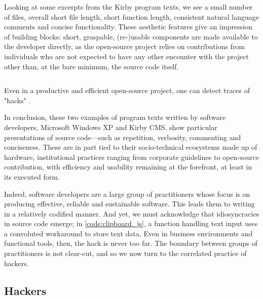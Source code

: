 Looking at some excerpts from the Kirby program texts, we see a small number of files, overall short file length, short function length, consistent natural language comments and concise functionality. These aesthetic features give an impression of building blocks: short, graspable, (re-)usable components are made available to the developer directly, as the open-source project relies on contributions from individuals who are not expected to have any other encounter with the project other than, at the bare minimum, the source code itself.

\begin{listing}
  \inputminted{js}{./corpus/clipboard.js}
  \caption{Even in a productive and efficient open-source project, one can detect traces of "hacks" \citep{allgeier_clipboard_2021}.}
  \label{code:clipboard_js}
\end{listing}

In conclusion, these two examples of program texts written by software developers, Microsoft Windows XP and Kirby CMS, show particular presentations of source code—such as repetition, verbosity, commenting and conciseness. These are in part tied to their socio-technical ecosystems made up of hardware, institutional practices ranging from corporate guidelines to open-source contribution, with efficiency and usability remaining at the forefront, at least in its executed form.

Indeed, software developers are a large group of practitioners whose focus is on producing effective, reliable and sustainable software. This leads them to writing in a relatively codified manner. And yet, we must acknowledge that idiosyncracies in source code emerge; in \ref{code:clipboard_js}, a function handling text input uses a convoluted workaround to store text data. Even in business environments and functional tools, then, the hack is never too far. The boundary between groups of practitioners is not clear-cut, and so we now turn to the correlated practice of hackers.

\subsection{Hackers}
\label{subsec:hackers}


